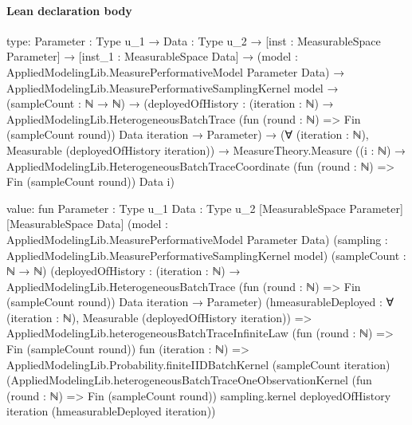 \documentclass[10pt]{article}
\begin{document}
\paragraph{Lean declaration body}
\begin{ReviewVerbatim}
type:
{Parameter : Type u_1} →
  {Data : Type u_2} →
    [inst : MeasurableSpace Parameter] →
      [inst_1 : MeasurableSpace Data] →
        (model : AppliedModelingLib.MeasurePerformativeModel Parameter Data) →
          AppliedModelingLib.MeasurePerformativeSamplingKernel model →
            (sampleCount : ℕ → ℕ) →
              (deployedOfHistory :
                  (iteration : ℕ) →
                    AppliedModelingLib.HeterogeneousBatchTrace (fun (round : ℕ) => Fin (sampleCount round)) Data
                        iteration →
                      Parameter) →
                (∀ (iteration : ℕ), Measurable (deployedOfHistory iteration)) →
                  MeasureTheory.Measure
                    ((i : ℕ) →
                      AppliedModelingLib.HeterogeneousBatchTraceCoordinate (fun (round : ℕ) => Fin (sampleCount round))
                        Data i)

value:
fun {Parameter : Type u_1} {Data : Type u_2} [MeasurableSpace Parameter] [MeasurableSpace Data]
    (model : AppliedModelingLib.MeasurePerformativeModel Parameter Data)
    (sampling : AppliedModelingLib.MeasurePerformativeSamplingKernel model) (sampleCount : ℕ → ℕ)
    (deployedOfHistory :
      (iteration : ℕ) →
        AppliedModelingLib.HeterogeneousBatchTrace (fun (round : ℕ) => Fin (sampleCount round)) Data iteration →
          Parameter)
    (hmeasurableDeployed : ∀ (iteration : ℕ), Measurable (deployedOfHistory iteration)) =>
  AppliedModelingLib.heterogeneousBatchTraceInfiniteLaw (fun (round : ℕ) => Fin (sampleCount round))
    fun (iteration : ℕ) =>
    AppliedModelingLib.Probability.finiteIIDBatchKernel (sampleCount iteration)
      (AppliedModelingLib.heterogeneousBatchTraceOneObservationKernel (fun (round : ℕ) => Fin (sampleCount round))
        sampling.kernel deployedOfHistory iteration (hmeasurableDeployed iteration))
\end{ReviewVerbatim}
\end{document}
